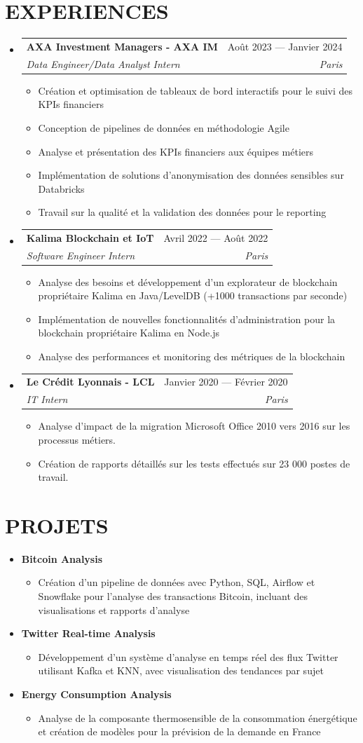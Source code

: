 \documentclass[11pt,a4paper]{article}
\makeatletter
\newcommand{\resumeItem}[1]{
  \item\footnotesize{
    {#1 \vspace{-1pt}}
  }
}
\newcommand{\resumeSubheading}[4]{
  \vspace{2pt}\item
    \begin{tabular*}{\textwidth}[t]{l@{\extracolsep{\fill}}r}
      {\footnotesize\textbf{#1}} & {\footnotesize#2} \\
      {\footnotesize\textit{#3}} & {\footnotesize\textit{#4}} \\
    \end{tabular*}\vspace{2pt}
}
\newcommand{\resumeProjectHeading}[2]{
  \item
  {\footnotesize#1} \hfill {#2}
}
\newcommand{\resumeSubHeadingListStart}{\begin{itemize}[leftmargin=0in, label={}]}
\newcommand{\resumeSubHeadingListEnd}{\end{itemize}}
\newcommand{\resumeItemListStart}{\begin{itemize}[label={\textbullet}]}
\newcommand{\resumeItemListEnd}{\end{itemize}\vspace{0pt}}
\makeatother
\begin{document}
\section{EXPERIENCES}
\resumeSubHeadingListStart
    \resumeSubheading
      {AXA Investment Managers - AXA IM}{Août 2023 --- Janvier 2024}
      {Data Engineer/Data Analyst Intern}{Paris}
      \resumeItemListStart
        \resumeItem{Création et optimisation de tableaux de bord interactifs pour le suivi des KPIs financiers}
        \resumeItem{Conception de pipelines de données en méthodologie Agile}
        \resumeItem{Analyse et présentation des KPIs financiers aux équipes métiers}
        \resumeItem{Implémentation de solutions d'anonymisation des données sensibles sur Databricks}
        \resumeItem{Travail sur la qualité et la validation des données pour le reporting}
      \resumeItemListEnd
    \resumeSubheading
      {Kalima Blockchain et IoT}{Avril 2022 --- Août 2022}
      {Software Engineer Intern}{Paris}
      \resumeItemListStart
        \resumeItem{Analyse des besoins et développement d'un explorateur de blockchain propriétaire Kalima en Java/LevelDB (+1000 transactions par seconde)}
        \resumeItem{Implémentation de nouvelles fonctionnalités d'administration pour la blockchain propriétaire Kalima en Node.js}
        \resumeItem{Analyse des performances et monitoring des métriques de la blockchain}
      \resumeItemListEnd
    \resumeSubheading
      {Le Crédit Lyonnais - LCL}{Janvier 2020 --- Février 2020}
      {IT Intern}{Paris}
      \resumeItemListStart
        \resumeItem{Analyse d'impact de la migration Microsoft Office 2010 vers 2016 sur les processus métiers.}
        \resumeItem{Création de rapports détaillés sur les tests effectués sur 23 000 postes de travail.}
      \resumeItemListEnd
  \resumeSubHeadingListEnd

\section{PROJETS}
\resumeSubHeadingListStart
    \resumeProjectHeading
      {\textbf{Bitcoin Analysis}} {}
      \resumeItemListStart
        \resumeItem{Création d'un pipeline de données avec Python, SQL, Airflow et Snowflake pour l'analyse des transactions Bitcoin, incluant des visualisations et rapports d'analyse}
      \resumeItemListEnd
    \resumeProjectHeading
      {\textbf{Twitter Real-time Analysis}} {}
      \resumeItemListStart
        \resumeItem{Développement d'un système d'analyse en temps réel des flux Twitter utilisant Kafka et KNN, avec visualisation des tendances par sujet}
      \resumeItemListEnd
    \resumeProjectHeading
      {\textbf{Energy Consumption Analysis \@Capgemini}} {}
      \resumeItemListStart
        \resumeItem{Analyse de la composante thermosensible de la consommation énergétique et création de modèles pour la prévision de la demande en France}
      \resumeItemListEnd
\resumeSubHeadingListEnd
\end{document}
